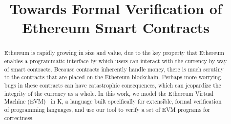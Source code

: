 \documentclass{llncs}
\begin{document}
\thispagestyle{empty}

\title{Towards Formal Verification of Ethereum  Smart Contracts}

\newif\ifblind\blindfalse %

\ifblind
\author{Everett Hildenbrandt\inst{1} \and Manasvi Saxena\inst{1} \and Deepak
Kumar\inst{1} \and Zane Ma\inst{1}}

\institute{University of Illinois, Urbana-Champaign}
\else
\author{}
\institute{}
\fi

\maketitle
\begin{abstract}
Ethereum is rapidly growing in size and value, due to the key property that
Ethereum enables a programmatic interface by which users can interact with the
currency by way of smart contracts. Because contracts inherently handle money, there
is much scrutiny to the contracts that are placed on the Ethereum blockchain.
Perhaps more worrying, bugs in these contracts can have catastrophic
consequences, which can jeopardize the integrity of the currency as a whole.
In this work, we model the Ethereum Virtual Machine
(EVM)~\cite{wood2014ethereum} in K, a language built
specifically for extensible, formal verification of programming languages, and
use our tool to verify a set of EVM programs for correctness.
\end{abstract}
% 










\small

\nocite{*}
\end{document}
